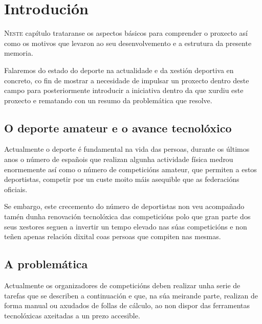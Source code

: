 \chapter{Introdución}
\minitoc


 \lettrine{N}{este} capítulo trataranse os aspectos básicos para comprender o proxecto 
así como os motivos que levaron ao seu desenvolvemento e a estrutura da presente 
memoria.

  Falaremos do estado do deporte na actualidade e da xestión deportiva en 
concreto, co fin de mostrar a necesidade de impulsar un proxecto dentro deste 
campo para posteriormente introducir a iniciativa dentro da que xurdiu este 
proxecto e rematando con un resumo da problemática que resolve.

  \section{O deporte amateur e o avance tecnolóxico}

    Actualmente o deporte é fundamental na vida das persoas, durante os últimos anos o 
número de españois que realizan algunha actividade física medrou enormemente así como o 
número de competicións amateur, que permiten a estos deportistas, competir por un custe 
moito máis asequible que as federacións oficiais.

    Se embargo, este crecemento do número de deportistas non veu acompañado tamén dunha 
renovación tecnolóxica das competicións polo que gran parte dos seus xestores seguen
a invertir un tempo elevado nas súas competicións e non teñen apenas 
relación dixital coas persoas que compiten nas mesmas.

    \section{A problemática}
    Actualmente os organizadores de competicións deben realizar unha serie de tarefas que 
se describen a continuación e que, na súa meirande parte, realizan de forma 
manual ou axudados de follas de cálculo, ao non dispor das ferramentas 
tecnolóxicas axeitadas a un prezo accesible.

